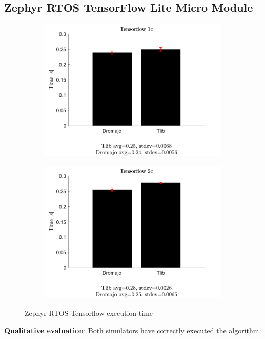 \pagebreak

\subsection{Zephyr RTOS TensorFlow Lite Micro Module}

\begin{figure}[h]
    \centering
    \begin{subfigure}{0.5\textwidth}
      \centering
      \includegraphics[width=1.2\linewidth]{figures/benchmarks/Tensorflow1c.pdf}
    \end{subfigure}%
    \begin{subfigure}{0.5\textwidth}
      \centering
      \includegraphics[width=1.2\linewidth]{figures/benchmarks/Tensorflow2c.pdf}
    \end{subfigure}
    \caption{Zephyr RTOS Tensorflow execution time}
\end{figure}
\textbf{Qualitative evaluation}: Both simulators have correctly executed the algorithm.
\vspace*{15px}

